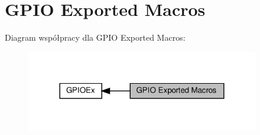 \hypertarget{group___g_p_i_o_ex___exported___macros}{}\section{G\+P\+IO Exported Macros}
\label{group___g_p_i_o_ex___exported___macros}
Diagram współpracy dla G\+P\+IO Exported Macros\+:\nopagebreak
\begin{figure}[H]
\begin{center}
\leavevmode
\includegraphics[width=288pt]{group___g_p_i_o_ex___exported___macros}
\end{center}
\end{figure}
